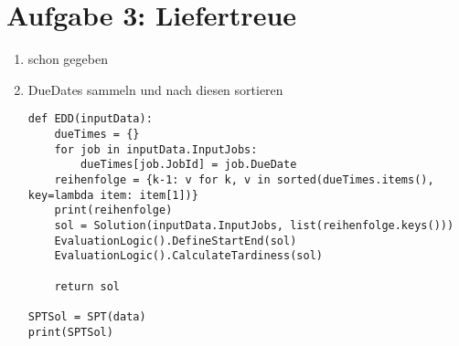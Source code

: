 \documentclass{article}
\begin{document}
	\section*{Aufgabe 3: Liefertreue}
	\begin{enumerate}[label=(\alph*)]
		\item schon gegeben
		\item DueDates sammeln und nach diesen sortieren
		\begin{lstlisting}
def EDD(inputData):
	dueTimes = {}
	for job in inputData.InputJobs:
		dueTimes[job.JobId] = job.DueDate
	reihenfolge = {k-1: v for k, v in sorted(dueTimes.items(), key=lambda item: item[1])}
	print(reihenfolge)
	sol = Solution(inputData.InputJobs, list(reihenfolge.keys()))
	EvaluationLogic().DefineStartEnd(sol)
	EvaluationLogic().CalculateTardiness(sol)

	return sol

SPTSol = SPT(data)
print(SPTSol)
		\end{lstlisting}
	\end{enumerate}
\end{document}
